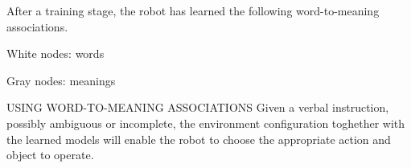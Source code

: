 \documentclass[aspectratio=169, 20pt]{beamer}
\begin{document}
\begin{frame}
  \large After a training stage, the robot has learned the following word-to-meaning associations.

  \vspace{1cm}
  White nodes: words
  
  Gray nodes: meanings
\end{frame}


\begin{frame}{\large USING WORD-TO-MEANING ASSOCIATIONS}
  Given a verbal instruction, possibly ambiguous or incomplete, the environment configuration toghether with the learned models will enable the robot to choose the appropriate action and object to operate.
\end{frame}
\end{document}
